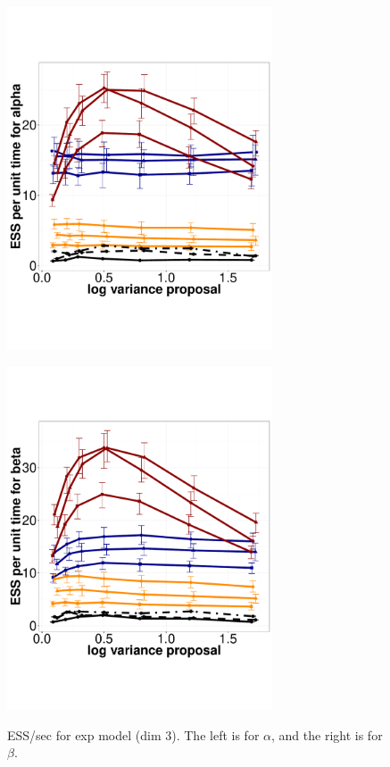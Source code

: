   \begin{figure}%
  \centering
  \begin{minipage}[!hp]{0.45\linewidth}
  \centering
    \includegraphics [width=0.70\textwidth, angle=0]{figs/exp_3_alpha.pdf}
      \end{minipage}
  \begin{minipage}[hp]{0.45\linewidth}
  \centering
    \includegraphics [width=0.70\textwidth, angle=0]{figs/exp_3_beta.pdf}
    \vspace{-0 in}
     \label{fig:ESS_EXP_D3}
  \end{minipage}
    \caption{ESS/sec for exp model (dim 3). The left is for $\alpha$, and the right is for $\beta$.}
  \end{figure}
